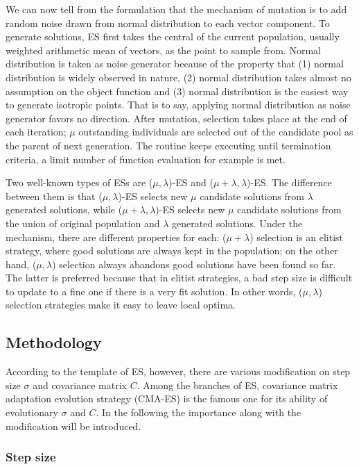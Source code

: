 We can now tell from the formulation that the mechanism of mutation is
to add random noise drawn from normal distribution to each vector
component.  To generate solutions, ES first takes the central of the
current population, usually weighted arithmetic mean of vectors, as the
point to sample from.  Normal distribution is taken as noise generator
because of the property that (1) normal distribution is widely observed
in nature, (2) normal distribution takes almost no assumption on the
object function and (3) normal distribution is the easiest way to
generate isotropic points.  That is to say, applying normal distribution
as noise generator favors no direction.  After mutation, selection takes
place at the end of each iteration; $\mu$ outstanding individuals are
selected out of the candidate pool as the parent of next generation.
The routine keeps executing until termination criteria, a limit number
of function evaluation for example is met.

Two well-known types of ESs are ($\mu, \lambda$)-ES and ($\mu+
\lambda,\lambda$)-ES\@.  The difference between them is that ($\mu,
\lambda$)-ES selects new $\mu$ candidate solutions from $\lambda$
generated solutions, while ($\mu+ \lambda, \lambda$)-ES selects new
$\mu$ candidate solutions from the union of original population and
$\lambda$ generated solutions.  Under the mechanism, there are different
properties for each: ($\mu+ \lambda$) selection is an elitist strategy,
where good solutions are always kept in the population; on the other
hand, ($\mu,\lambda$) selection always abandons good solutions have been
found so far.  The latter is preferred because that in elitist
strategies, a bad step size is difficult to update to a fine one if
there is a very fit solution.  In other words, ($\mu, \lambda$)
selection strategies make it easy to leave local optima.

\subsection{Methodology}

According to the template of ES, however, there are various modification
on step size $\sigma$ and covariance matrix $C$.  Among the branches of
ES, covariance matrix adaptation evolution strategy (CMA-ES) is the
famous one for its ability of evolutionary $\sigma$ and $C$.  In the
following the importance along with the modification will be introduced.

\subsubsection{Step size}

